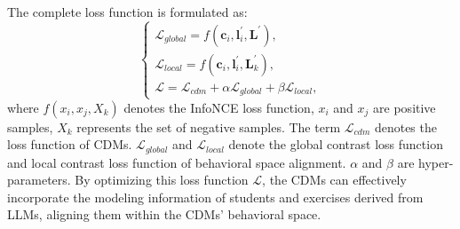The complete loss function is formulated as:
\begin{equation}
    \left\{\begin{matrix}
    \mathcal{L}_{global}=f(\mathbf{c}_i, \mathbf{l}^\prime_i, \mathbf{L}^\prime),   \\
    \mathcal{L}_{local}=f(\mathbf{c}_i, \mathbf{l}^\prime_i, \mathbf{L}^\prime_k),   \\
    \mathcal{L}=\mathcal{L}_{cdm}+\alpha\mathcal{L}_{global}+\beta\mathcal{L}_{local},
    \end{matrix}\right.
\end{equation}
where $f(x_i, x_j, X_k)$ denotes the InfoNCE loss function, $x_i$ and $x_j$ are positive samples, $X_k$ represents the set of negative samples. The term $\mathcal{L}_{cdm}$ denotes the loss function of CDMs. $\mathcal{L}_{global}$ and $\mathcal{L}_{local}$ denote the global contrast loss function and local contrast loss function of behavioral space alignment. $\alpha$ and $\beta$ are hyper-parameters.
By optimizing this loss function $\mathcal{L}$, the CDMs can effectively incorporate the modeling information of students and exercises derived from LLMs, aligning them within the CDMs' behavioral space.



